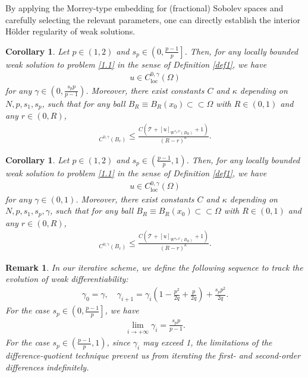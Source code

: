 \documentclass[reqno,10pt]{amsart}
\numberwithin{equation}{section}
\newtheorem{remark}[theorem]{Remark}
\newtheorem{corollary}[theorem]{Corollary}
\begin{document}
By applying the Morrey-type embedding for (fractional) Sobolev spaces and carefully selecting the relevant parameters, one can directly establish the interior Hölder regularity of weak solutions.

\begin{corollary}
	\label{cor13}
	Let $p\in (1,2)$ and $s_p\in\left( 0,\frac{p-1}{p}\right] $. Then, for any locally bounded weak solution to problem \eqref{1.1} in the sense of Definition \ref{def1}, we have
	\begin{align*}
		u\in C^{0, \gamma}_\mathrm{loc}(\Omega)
	\end{align*}
	for any $\gamma\in \left( 0,\frac{s_p p}{p-1}\right)$. Moreover, there exist constants $C$ and $\kappa$ depending on $N, p, s_1, s_p$, such that for any ball $B_R\equiv B_R(x_0)\subset\subset\Omega$ with $R\in (0,1)$ and any $r\in(0,R)$,
	\begin{align*}
		[u]_{C^{0,\gamma}(B_r)}\le \frac{C\left( \mathcal{T}+[u]_{W^{s_p,p}(B_R)}+1\right) }{(R-r)^{\kappa}}.
	\end{align*}
\end{corollary}

\begin{corollary}
	\label{cor27}
	Let $p\in (1,2)$ and $s_p\in \left( \frac{p-1}{p},1\right) $. Then, for any locally bounded weak solution to problem \eqref{1.1} in the sense of Definition \ref{def1}, we have
	\begin{align*}
		u\in C^{0,\gamma}_\mathrm{loc}(\Omega)
	\end{align*}
	for any $\gamma\in(0,1)$. Moreover, there exist constants $C$ and $\kappa$ depending on $N, p, s_1, s_p, \gamma$, such that for any ball $B_R\equiv B_R(x_0)\subset\subset\Omega$ with $R\in(0,1)$ and any $r\in(0,R)$,
	\begin{align*}
		[u]_{C^{0,\gamma}(B_r)}\le \frac{C\left( \mathcal{T}+[u]_{W^{s_p,p}(B_R)}+1\right) }{(R-r)^{\kappa}}.
	\end{align*}
\end{corollary}

\begin{remark}
	In our iterative scheme, we define the following sequence to track the evolution of weak differentiability:
	\begin{align*}
		\gamma_0=\gamma,\quad \gamma_{i+1}=\gamma_i\left(1-\frac{p^2}{2 q}+\frac{p}{2 q}\right)+\frac{s_pp^2}{2 q}.
	\end{align*}
	For the case $s_p \in \left(0,  \frac{p-1}{p} \right]$, we have
	\begin{align*}
		\lim\limits_{i\rightarrow+\infty}\gamma_i=\frac{s_pp}{p-1}.
	\end{align*}
	For the case $s_p \in \left( \frac{p-1}{p}, 1 \right)$, since $\gamma_i$ may exceed 1, the limitations of the difference-quotient technique prevent us from iterating the first- and second-order differences indefinitely.
\end{remark}
\end{document}
